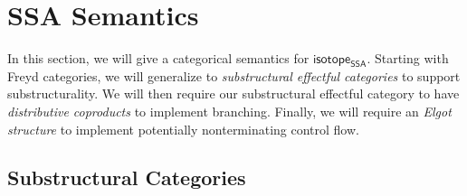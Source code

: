 \documentclass[acmsmall,screen,review]{acmart}
\newcommand{\ms}[1]{\ensuremath{\mathsf{#1}}}
\newcommand{\isotopessa}{\ms{isotope_{SSA}}}
\begin{document}
\section{SSA Semantics}

\label{sec:semantics}

In this section, we will give a categorical semantics for \isotopessa. Starting
with Freyd categories, we will generalize to \textit{substructural effectful
categories} to support substructurality. We will then require our substructural
effectful category to have \textit{distributive coproducts} to implement
branching. Finally, we will require an \textit{Elgot structure} to implement
potentially nonterminating control flow.

\subsection{Substructural Categories}
\end{document}
